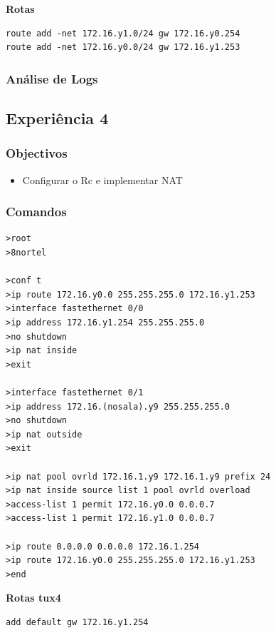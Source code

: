 \documentclass[a4paper,11pt]{article}
\begin{document}
\textbf{Rotas}

\begin{lstlisting}
route add -net 172.16.y1.0/24 gw 172.16.y0.254
route add -net 172.16.y0.0/24 gw 172.16.y1.253
\end{lstlisting}

\subsubsection{Análise de Logs}

\subsection{Experiência 4}
\subsubsection{Objectivos}

\begin{itemize}
\item Configurar o Rc e implementar NAT
\end{itemize}

\subsubsection{Comandos}

\begin{lstlisting}
>root
>8nortel

>conf t
>ip route 172.16.y0.0 255.255.255.0 172.16.y1.253 
>interface fastethernet 0/0 
>ip address 172.16.y1.254 255.255.255.0 
>no shutdown 
>ip nat inside 
>exit 

>interface fastethernet 0/1 
>ip address 172.16.(nosala).y9 255.255.255.0 
>no shutdown 
>ip nat outside 
>exit 

>ip nat pool ovrld 172.16.1.y9 172.16.1.y9 prefix 24
>ip nat inside source list 1 pool ovrld overload 
>access-list 1 permit 172.16.y0.0 0.0.0.7 
>access-list 1 permit 172.16.y1.0 0.0.0.7 

>ip route 0.0.0.0 0.0.0.0 172.16.1.254 
>ip route 172.16.y0.0 255.255.255.0 172.16.y1.253 
>end
\end{lstlisting}

\textbf{Rotas tux4}
\begin{lstlisting}
add default gw 172.16.y1.254 
\end{lstlisting}
\end{document}
